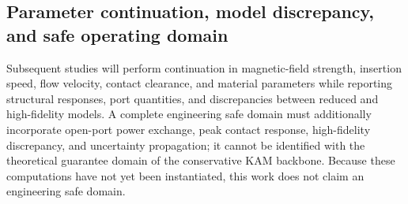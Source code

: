\subsection{Parameter continuation, model discrepancy, and safe operating domain}\label{sec:numerical-6-6}

Subsequent studies will perform continuation in magnetic-field strength, insertion speed, flow velocity, contact clearance, and material parameters while reporting structural responses, port quantities, and discrepancies between reduced and high-fidelity models. A complete engineering safe domain must additionally incorporate open-port power exchange, peak contact response, high-fidelity discrepancy, and uncertainty propagation; it cannot be identified with the theoretical guarantee domain of the conservative KAM backbone. Because these computations have not yet been instantiated, this work does not claim an engineering safe domain.
